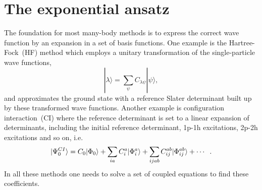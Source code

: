 \section{The exponential ansatz}
The foundation for most many-body methods is to express the correct wave function by an expansion in a set of basis functions. 
One example is the Hartree-Fock~(HF) method which employs a unitary transformation of the single-particle wave functions, 
\begin{equation}
|\lambda \rangle = \sum_{\psi} C_{\lambda \psi} |\psi \rangle ,
\end{equation}
and approximates the ground state with a reference Slater determinant built up by these transformed wave functions.
Another example is configuration interaction~(CI) where the reference determinant is set to a linear expansion of determinants, including the initial reference determinant, 1p-1h excitations, 2p-2h excitations and so on, i.e.
\begin{equation}
|\Psi_{0}^{CI} \rangle = C_0 |\Phi_0 \rangle + \sum_{ia} C_i^a |\Phi_i^a\rangle + \sum_{ijab} C_{ij}^{ab} |\Phi_{ij}^{ab} \rangle + \cdots \hspace{2mm}.
\end{equation}
In all these methods one needs to solve a set of coupled equations to find these coefficients.

